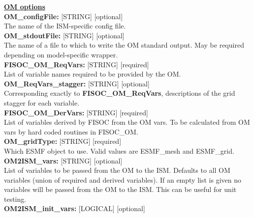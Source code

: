 \documentclass[11pt]{article}
\begin{document}
\begin{flushleft}
\textbf{\underline{OM options}} \\
\vspace{6pt}
\textbf{OM\_configFile:}      [STRING] [optional]                          \\
The name of the ISM-specific config file.                                  \\
\vspace{6pt}
\textbf{OM\_stdoutFile:}     [STRING] [optional]                           \\
The name of a file to which to write the OM standard output.  May be 
required depending on model-specific wrapper.                              \\
\vspace{6pt}
\textbf{FISOC\_OM\_ReqVars:}  [STRING] [required]                          \\
List of variable names required to be provided by the OM.                  \\
\vspace{6pt}
\textbf{OM\_ReqVars\_stagger:} [STRING] [optional]                         \\
Corresponding exactly to \textbf{FISOC\_OM\_ReqVars}, descriptions of the 
grid stagger for each variable.                                            \\
\vspace{6pt}
\textbf{FISOC\_OM\_DerVars:}  [STRING] [required]                          \\
List of variables derived by FISOC from the OM vars.  
To be calculated from OM vars by hard coded routines in FISOC\_OM.        \\
\vspace{6pt}
\textbf{OM\_gridType:}        [STRING] [required]                           \\
Which ESMF object to use.  Valid values are ESMF\_mesh and ESMF\_grid.     \\
\vspace{6pt}
\textbf{OM2ISM\_vars:}        [STRING] [optional]                          \\
List of variables to be passed from the OM to the ISM. Defaults to 
all OM variables (union of required and derived variables). If an empty 
list is given no variables will be passed from the OM to the ISM.  This 
can be useful for unit testing.                                            \\ 
\vspace{6pt}
\textbf{OM2ISM\_init\_vars:}  [LOGICAL] [optional]                         \\

\end{flushleft}
\end{document}
